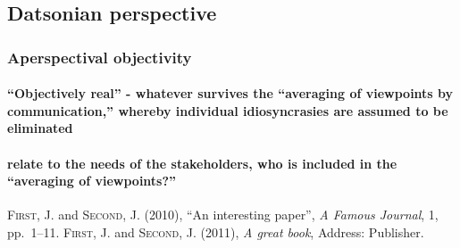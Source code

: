 \documentclass{lps}
\begin{document}
\subsection{Datsonian perspective}

\subsubsection{Aperspectival objectivity}

\paragraph{“Objectively real” - whatever survives the “averaging of viewpoints
by communication,” whereby individual idiosyncrasies are assumed to be
eliminated}

\paragraph{relate to the needs of the stakeholders, who is included in the
“averaging of viewpoints?”}





\begin{thebibliography}{AAA}
 \textsc{First, J.} and \textsc{Second, J.} (2010), ``An interesting paper'', \emph{A Famous Journal}, 1, pp.~1--11.
 \textsc{First, J.} and \textsc{Second, J.} (2011), \emph{A great book}, Address: Publisher.
\end{thebibliography}
\end{document}
